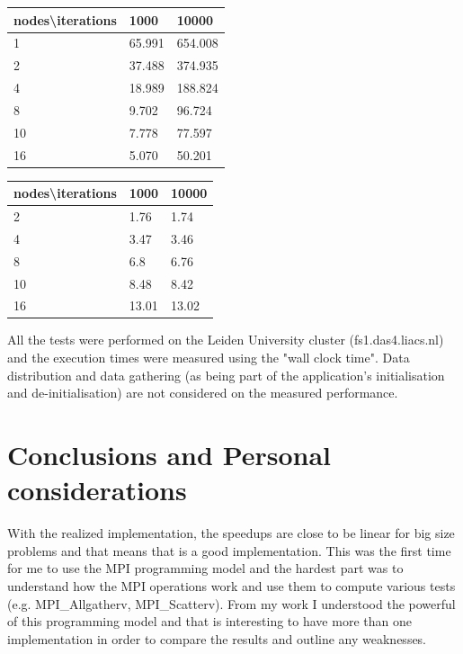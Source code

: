 \documentclass[a4paper]{article}
\begin{document}
\begin{minipage}[b]{.40\textwidth}
  \centering
  \begin{tabular}{l|l|l}
  \centering
nodes\textbackslash iterations & 1000 & 10000 \\ \hline
1 & 65.991 & 654.008 \\ \hline
2 & 37.488 & 374.935 \\ \hline
4 & 18.989 & 188.824 \\ \hline
8 & 9.702 & 96.724 \\ \hline
10 & 7.778 & 77.597 \\ \hline
16 & 5.070 & 50.201 \\ 
    \hline
  \end{tabular}
  \label{tab:R3_t1}
\end{minipage} \qquad
\begin{minipage}[b]{.40\textwidth}
  \centering
  \begin{tabular}{l|l|l}
nodes\textbackslash iterations & 1000 & 10000 \\ \hline
2 & 1.76 & 1.74 \\ \hline
4 & 3.47 & 3.46 \\ \hline
8 & 6.8 & 6.76 \\ \hline
10 & 8.48 & 8.42 \\ \hline
16 & 13.01 & 13.02 \\ 
  \hline
  \end{tabular}
  \label{tab:R3_t2}
\end{minipage}	

All the tests were performed on the Leiden University cluster (fs1.das4.liacs.nl) and the execution times were measured using the "wall clock time". Data distribution and data gathering (as being part of the application's initialisation and de-initialisation) are not considered on the measured performance.

\section{Conclusions and Personal considerations}
\label{sec:con}
With the realized implementation, the speedups are close to be linear for big size problems and that means that is a good implementation. This was the first time for me to use the MPI programming model and the hardest part was to understand how the MPI operations work and use them to compute various tests (e.g. MPI\_Allgatherv, MPI\_Scatterv). From my work I understood the powerful of this programming model and that is interesting to have more than one implementation in order to compare the results and outline any weaknesses.  

		
\printbibliography 
\end{document}

